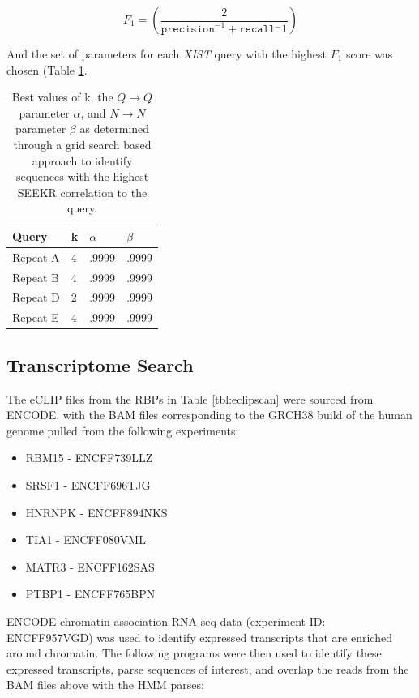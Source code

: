 \begin{equation}
    F_1 = \left(\frac{2}{\texttt{precision}^{-1}+\texttt{recall}{^-1}}\right)
\end{equation}

And the set of parameters for each \emph{XIST} query with the highest $F_1$ score was chosen (Table \ref{tbl:rsxparams}.

\begin{table}[h]
\centering
\begin{center}
 \begin{tabular}{|l| l| l | l |} 
 \hline
 Query & k & $\alpha$ & $\beta$ \\
 \hline
 Repeat A & 4 & .9999 & .9999 \\ 
 \hline
 Repeat B & 4 & .9999 & .9999\\
 \hline
 Repeat D & 2 & .9999 & .9999\\
 \hline
 Repeat E & 4 & .9999 & .9999\\
 \hline
\end{tabular}
\end{center}
\caption{Best values of k, the $Q\rightarrow Q$ parameter $\alpha$, and $N\rightarrow N$ parameter $\beta$ as determined through a grid search based approach to identify sequences with the highest SEEKR correlation to the query.}
\label{tbl:rsxparams}
\end{table}

\subsection{Transcriptome Search}
The eCLIP files from the RBPs in Table \ref{tbl:eclipscan} were sourced from ENCODE, with the BAM files corresponding to the GRCH38 build of the human genome pulled from the following experiments: 

\begin{itemize}
  \item RBM15 - ENCFF739LLZ
  \item SRSF1 - ENCFF696TJG
  \item HNRNPK - ENCFF894NKS
  \item TIA1 - ENCFF080VML
  \item MATR3 - ENCFF162SAS
  \item PTBP1 - ENCFF765BPN
\end{itemize}

ENCODE chromatin association RNA-seq data (experiment ID: ENCFF957VGD) was used to identify expressed transcripts that are enriched around chromatin. The following programs were then used to identify these expressed transcripts, parse sequences of interest, and overlap the reads from the BAM files above with the HMM parses: 

